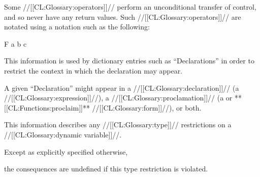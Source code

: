 
Some //[[CL:Glossary:operators]]// perform an unconditional transfer of control, and
so never have any return values.  Such //[[CL:Glossary:operators]]// are notated using
a notation such as the following:

\DefunNoReturn F {a b c}

\endsubsubsubsubsection%

\endsubsubsubsection%

\endsubsubsection%


This information is used by dictionary entries such as ``Declarations''
in order to restrict the context in which the declaration may appear.

A given ``Declaration'' might appear in 
     a //[[CL:Glossary:declaration]]// (\ie a  //[[CL:Glossary:expression]]//),
     a //[[CL:Glossary:proclamation]]// (\ie a  or **[[CL:Functions:proclaim]]** //[[CL:Glossary:form]]//),
  or both.

\endsubsubsection%


This information describes any //[[CL:Glossary:type]]// restrictions on a //[[CL:Glossary:dynamic variable]]//.




Except as explicitly specified otherwise,

the consequences are undefined if this type restriction is violated.

\endsubsubsection%

\endsubSection%
